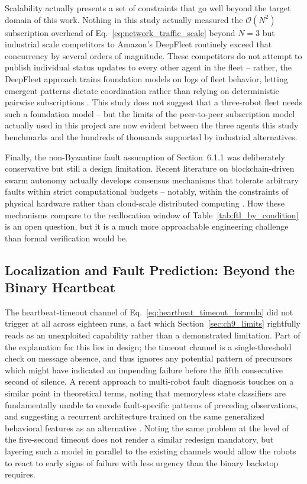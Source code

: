 Scalability actually presents a set of constraints that go well beyond the target domain of this work. Nothing in this study actually measured the $\mathcal{O}(N^2)$ subscription overhead of Eq.~\eqref{eq:network_traffic_scale} beyond $N=3$ but industrial scale competitors to Amazon's DeepFleet routinely exceed that concurrency by several orders of magnitude. These competitors do not attempt to publish individual status updates to every other agent in the fleet -- rather, the DeepFleet approach trains foundation models on logs of fleet behavior, letting emergent patterns dictate coordination rather than relying on deterministic pairwise subscriptions \cite{agaskar2025deepfleet}. This study does not suggest that a three-robot fleet needs such a foundation model -- but the limits of the peer-to-peer subscription model actually used in this project are now evident between the three agents this study benchmarks and the hundreds of thousands supported by industrial alternatives.

Finally, the non-Byzantine fault assumption of Section~6.1.1 was deliberately conservative but still a design limitation. Recent literature on blockchain-driven swarm autonomy actually develops consensus mechanisms that tolerate arbitrary faults within strict computational budgets -- notably, within the constraints of physical hardware rather than cloud-scale distributed computing \cite{wang2025byzantineswarm}. How these mechanisms compare to the reallocation window of Table~\ref{tab:ftl_by_condition} is an open question, but it is a much more approachable engineering challenge than formal verification would be.

\subsection{Localization and Fault Prediction: Beyond the Binary Heartbeat}

The heartbeat-timeout channel of Eq.~\eqref{eq:heartbeat_timeout_formula} did not trigger at all across eighteen runs, a fact which Section~\ref{sec:ch9_limits} rightfully reads as an unexploited capability rather than a demonstrated limitation. Part of the explanation for this lies in design; the timeout channel is a single-threshold check on message absence, and thus ignores any potential pattern of precursors which might have indicated an impending failure before the fifth consecutive second of silence. A recent approach to multi-robot fault diagnosis touches on a similar point in theoretical terms, noting that memoryless state classifiers are fundamentally unable to encode fault-specific patterns of preceding observations, and suggesting a recurrent architecture trained on the same generalized behavioral features as an alternative \cite{couceiro2026learning}. Noting the same problem at the level of the five-second timeout does not render a similar redesign mandatory, but layering such a model in parallel to the existing channels would allow the robots to react to early signs of failure with less urgency than the binary backstop requires.

